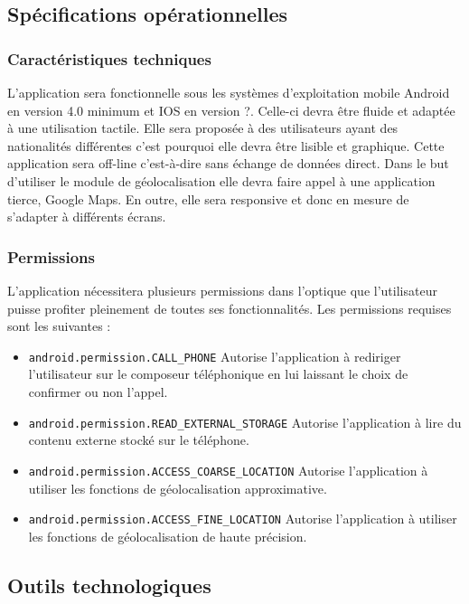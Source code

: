 \subsection{Spécifications opérationnelles}

\subsubsection{Caractéristiques techniques}
	L'application sera fonctionnelle sous les systèmes d'exploitation mobile Android en version 4.0 minimum et IOS en version ?. Celle-ci devra être fluide et adaptée à une utilisation tactile. Elle sera proposée à des  utilisateurs ayant des nationalités différentes c'est pourquoi elle devra être lisible et graphique.
	Cette application sera off-line c'est-à-dire sans échange de données direct. Dans le but d'utiliser le module de géolocalisation elle devra faire appel à une application tierce, Google Maps. En outre, elle sera responsive et donc en mesure de s'adapter à différents écrans.

\subsubsection{Permissions}

	L'application nécessitera plusieurs permissions dans l'optique que l'utilisateur puisse profiter pleinement de toutes ses fonctionnalités. Les permissions requises sont les suivantes : 
	\begin{itemize}
		\item \texttt{android.permission.CALL\_PHONE} Autorise l'application à rediriger l'utilisateur sur le composeur téléphonique en lui laissant le choix de confirmer ou non l'appel.
		\item \texttt{android.permission.READ\_EXTERNAL\_STORAGE} Autorise l'application à lire du contenu externe stocké sur le téléphone.
		\item \texttt{android.permission.ACCESS\_COARSE\_LOCATION} Autorise l'application à utiliser les fonctions de géolocalisation approximative.
		\item \texttt{android.permission.ACCESS\_FINE\_LOCATION} Autorise l'application à utiliser les fonctions de géolocalisation de haute précision.
	\end{itemize}
	
\subsection{Outils technologiques}

